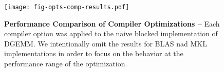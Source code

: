 
\begin{figure}

  \centering
  \texttt{[image: fig-opts-comp-results.pdf]}

  \caption{\textbf{Performance Comparison of Compiler Optimizations --}
    Each compiler option was applied to the naive blocked implementation
    of DGEMM. We intentionally omit the results for BLAS nad MKL
    implementations in order to focus on the behavior at the performance
    range of the optimization.}

  \label{fig-opts-comp-results}

\end{figure}
